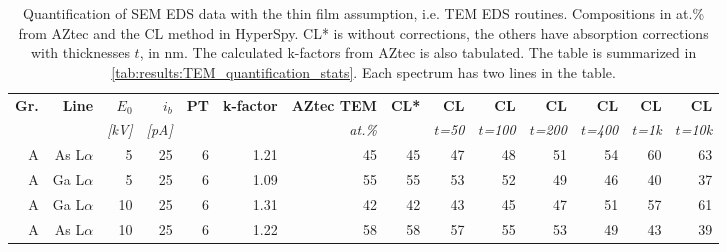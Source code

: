 \begin{table}[phtb]
    \begin{center}
        \caption{
            Quantification of SEM EDS data with the thin film assumption, i.e. TEM EDS routines.
            Compositions in at.\% from AZtec and the CL method in HyperSpy. CL* is without corrections, the others have absorption corrections with thicknesses $t$, in nm.
            The calculated k-factors from AZtec is also tabulated.
            The table is summarized in \cref{tab:results:TEM_quantification_stats}.
            Each spectrum has two lines in the table.
        }
        \label{tab:results:TEM_quantification}
        \begin{tabular}{rrrrrrrrrrrrrr}
            \hline
            \textbf{Gr.} & \textbf{Line} & \textbf{$E_0$} & \textbf{$i_b$} & \textbf{PT} & \textbf{k-factor} & \textbf{AZtec TEM} & \textbf{CL*} & \textbf{CL}   & \textbf{CL}    & \textbf{CL}    & \textbf{CL}    & \textbf{CL}   & \textbf{CL}    \\
            \emph{}      & \emph{}       & \emph{[kV]}    & \emph{[pA]}    & \emph{}     & \emph{}           & \emph{at.\%}       & \emph{}      & \emph{$t$=50} & \emph{$t$=100} & \emph{$t$=200} & \emph{$t$=400} & \emph{$t$=1k} & \emph{$t$=10k} \\
            \hline
            A            & As L$\alpha$  & 5              & 25             & 6           & 1.21              & 45                 & 45           & 47            & 48             & 51             & 54             & 60            & 63             \\
            A            & Ga L$\alpha$  & 5              & 25             & 6           & 1.09              & 55                 & 55           & 53            & 52             & 49             & 46             & 40            & 37             \\
            A            & Ga L$\alpha$  & 10             & 25             & 6           & 1.31              & 42                 & 42           & 43            & 45             & 47             & 51             & 57            & 61             \\
            A            & As L$\alpha$  & 10             & 25             & 6           & 1.22              & 58                 & 58           & 57            & 55             & 53             & 49             & 43            & 39             \\

\end{tabular}
\end{center}
\end{table}
